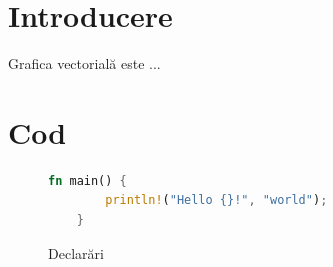 \documentclass[a4paper, 12pt]{report}
\begin{document}
\makeatother

\chapter{Introducere}

Grafica vectorială \cite{vector_graphics_wikipedia} este ...

\chapter{Cod}

\begin{figure}[ht]
    \centering
    \begin{lstlisting}[language=Rust]
    fn main() {
        println!("Hello {}!", "world");
    }
    \end{lstlisting}
    \caption{Declarări}
    \label{fig-rust}
\end{figure}

\printbibliography
\end{document}
